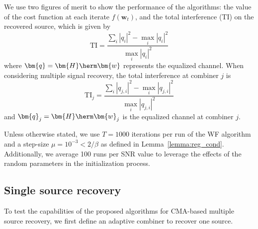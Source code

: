 We use two figures of merit to show the performance of the algorithms: the value of the cost function at each iterate $f(\bm{w}_t)$, and the total interference (TI) on the recovered source, which is given by
\begin{equation}
\mathrm{TI}=\frac{\sum_i |q_{i}|^2- \max_i |q_{i}|^2}{\max_i |q_{i}|^2} \label{eqn:totalinterference}
\end{equation}
where $\bm{q} = \bm{H}\herm\bm{w}$ represents the equalized channel. 
When considering multiple signal recovery, the total interference at combiner $j$ is
\begin{equation}
\mathrm{TI}_j=\frac{\sum_i |q_{j,i}|^2- \max_i |q_{j,i}|^2}{\max_i |q_{j,i}|^2} \label{eqn:totalinterferenceMSR}
\end{equation}
and  $\bm{q}_j = \bm{H}\herm\bm{w}_j$ is the equalized channel at combiner $j$.


Unless otherwise stated, we use $T=1000$ iterations per run of the WF algorithm and a step-size $\mu=10^{-3}<2/\beta$ as defined in Lemma~\ref{lemma:reg_cond}. Additionally, we average 100 runs per SNR value to leverage the effects of the random parameters in the initialization process.


\subsection{Single source recovery} \label{sec:sim_wf}
To test the capabilities of the proposed algorithms for CMA-based multiple source recovery, we first define an adaptive combiner to recover one source.

